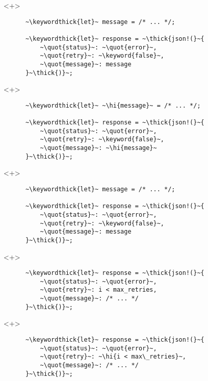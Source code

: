 \documentclass[usepdftitle=false]{beamer}
\newcommand{\thick}[1]{\contourlength{0.16pt}\contour[10]{black}{#1}}
\newcommand{\slantbox}[2][.5]
  {%
    \mbox
      {%
        \sbox{\foobox}{#2}%
        \hskip\wd\foobox
        \pdfsave
        \pdfsetmatrix{1 0 #1 1}%
        \llap{\usebox{\foobox}}%
        \pdfrestore
      }%
  }
\newcommand{\backslantbox}[2][.5]
  {%
    \mbox
      {%
        \sbox{\foobox}{#2}%
        \hskip\wd\foobox
        \pdfsave
        \pdfsetmatrix{-1 0 #1 1}%
        \llap{\usebox{\foobox}}%
        \pdfrestore
      }%
  }
\newcommand{\hi}[1]{%
\tikz[baseline=(A.base)]
 \node[highlighting=yellowbg,inner sep=0pt,text depth=0pt] (A) {#1};%
}
\newcommand{\openquote}{\backslantbox[.2]{\hspace{11pt}''\hspace{-11pt}}}
\newcommand{\closequote}{\slantbox[-.2]{\hspace{2pt}''\hspace{-2pt}}}
\newcommand{\blackquote}[1]{\openquote#1\closequote}
\newcommand{\quot}[1]{{\color{redish}\blackquote{#1}}}
\newcommand{\keyword}[1]{\color{greenish}#1}
\newcommand{\keywordthick}[1]{\color{greenish}\contourlength{0.20pt}\contour[10]{greenish}{#1}}
\begin{document}
\begin{frame}[fragile]
  \begin{onlyenv}<+>
    \begin{verbatim}
      ~\keywordthick{let}~ message = /* ... */;

      ~\keywordthick{let}~ response = ~\thick{json!(}~{
          ~\quot{status}~: ~\quot{error}~,
          ~\quot{retry}~: ~\keyword{false}~,
          ~\quot{message}~: message
      }~\thick{)}~;
    \end{verbatim}
  \end{onlyenv}
  \begin{onlyenv}<+>
    \begin{verbatim}
      ~\keywordthick{let}~ ~\hi{message}~ = /* ... */;

      ~\keywordthick{let}~ response = ~\thick{json!(}~{
          ~\quot{status}~: ~\quot{error}~,
          ~\quot{retry}~: ~\keyword{false}~,
          ~\quot{message}~: ~\hi{message}~
      }~\thick{)}~;
    \end{verbatim}
  \end{onlyenv}
  \begin{onlyenv}<+>
    \begin{verbatim}
      ~\keywordthick{let}~ message = /* ... */;

      ~\keywordthick{let}~ response = ~\thick{json!(}~{
          ~\quot{status}~: ~\quot{error}~,
          ~\quot{retry}~: ~\keyword{false}~,
          ~\quot{message}~: message
      }~\thick{)}~;
    \end{verbatim}
  \end{onlyenv}
\end{frame}

\begin{frame}[fragile]
  \begin{onlyenv}<+>
    \begin{verbatim}
      ~\keywordthick{let}~ response = ~\thick{json!(}~{
          ~\quot{status}~: ~\quot{error}~,
          ~\quot{retry}~: i < max_retries,
          ~\quot{message}~: /* ... */
      }~\thick{)}~;
    \end{verbatim}
  \end{onlyenv}
  \begin{onlyenv}<+>
    \begin{verbatim}
      ~\keywordthick{let}~ response = ~\thick{json!(}~{
          ~\quot{status}~: ~\quot{error}~,
          ~\quot{retry}~: ~\hi{i < max\_retries}~,
          ~\quot{message}~: /* ... */
      }~\thick{)}~;
    \end{verbatim}
  \end{onlyenv}
\end{frame}
\end{document}
